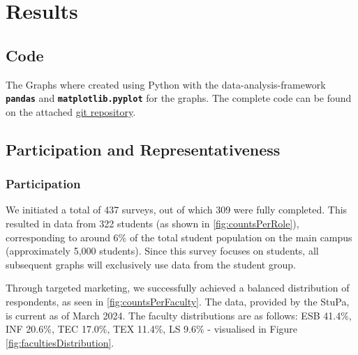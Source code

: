\chapter{Results}



\section{Code}
The Graphs where created using Python with the data-analysis-framework \textbf{\texttt{pandas}} and \textbf{\texttt{matplotlib.pyplot}} for the graphs. The complete code can be found on the attached \href{https://github.com/frederikbeimgraben/Statistik-und-Biometrie-Praesentation}{git repository}.


\section{Participation and Representativeness}
\subsection{Participation}
We initiated a total of 437 surveys, out of which 309 were fully completed. This resulted in data from 322 students (as shown in \ref{fig:countsPerRole}), corresponding to around 6\% of the total student population on the main campus (approximately 5,000 students). Since this survey focuses on students, all subsequent graphs will exclusively use data from the student group.

Through targeted marketing, we successfully achieved a balanced distribution of respondents, as seen in \ref{fig:countsPerFaculty}.  
The  data, provided by the StuPa, is current as of March 2024. The faculty distributions are as follows: ESB 41.4\%, INF 20.6\%, TEC 17.0\%, TEX 11.4\%, LS 9.6\% - visualised in Figure \ref{fig:facultiesDistribution}.

